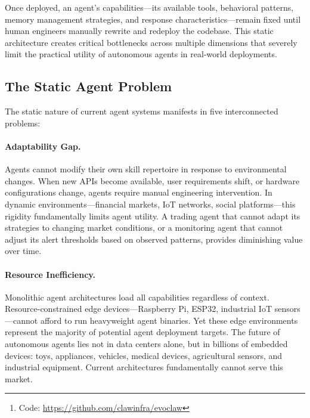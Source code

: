 \documentclass{article}
\newcommand{\evoclaw}{\texttt{EvoClaw}\xspace}
\begin{document}
\begin{abstract}
We formalize genome evolution as constrained optimization over a skill configuration space and prove monotonic fitness improvement under mild assumptions. Our Rust implementation achieves 90\%+ test coverage with 383 tests, runs on a Raspberry Pi~1 (ARMv6, 512MB RAM) with 3.0\,MB binary and 3.2\,MB RSS, and our Go orchestrator manages 500+ concurrent agents via MQTT with sub-50\,ms latency. Experimental evaluation demonstrates 98\%+ retrieval accuracy (vs. 70--80\% for vector RAG), 10--100$\times$ cost reduction through intelligent routing, and stable 24+ hour continuous operation. \evoclaw{} opens research directions in self-modifying systems, edge AI, and autonomous agent economies.\footnote{Code: \url{https://github.com/clawinfra/evoclaw}}
\end{abstract}Once deployed, an agent's capabilities—its available tools, behavioral patterns, memory management strategies, and response characteristics—remain fixed until human engineers manually rewrite and redeploy the codebase. This static architecture creates critical bottlenecks across multiple dimensions that severely limit the practical utility of autonomous agents in real-world deployments.

\subsection{The Static Agent Problem}

The static nature of current agent systems manifests in five interconnected problems:

\paragraph{Adaptability Gap.} Agents cannot modify their own skill repertoire in response to environmental changes. When new APIs become available, user requirements shift, or hardware configurations change, agents require manual engineering intervention. In dynamic environments—financial markets, IoT networks, social platforms—this rigidity fundamentally limits agent utility. A trading agent that cannot adapt its strategies to changing market conditions, or a monitoring agent that cannot adjust its alert thresholds based on observed patterns, provides diminishing value over time.

\paragraph{Resource Inefficiency.} Monolithic agent architectures load all capabilities regardless of context. Resource-constrained edge devices—Raspberry Pi, ESP32, industrial IoT sensors—cannot afford to run heavyweight agent binaries. Yet these edge environments represent the majority of potential agent deployment targets. The future of autonomous agents lies not in data centers alone, but in billions of embedded devices: toys, appliances, vehicles, medical devices, agricultural sensors, and industrial equipment. Current architectures fundamentally cannot serve this market.
\end{document}
